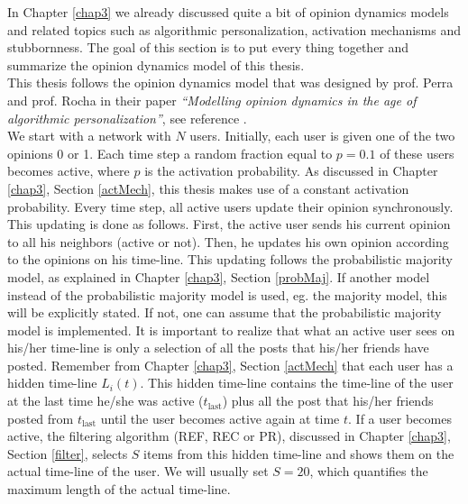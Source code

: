 \documentclass[11 pt , letterpaper , twoside , openright]{book}
\begin{document}
In Chapter \ref{chap3} we already discussed quite a bit of opinion dynamics models and related topics such as algorithmic personalization, activation mechanisms and stubbornness. The goal of this section is to put every thing together and summarize the opinion dynamics model of this thesis.\\
\newline
This thesis follows the opinion dynamics model that was designed by prof. Perra and prof. Rocha in their paper \textit{``Modelling opinion dynamics in the age of algorithmic personalization''}, see reference \cite{Perra2019}. \\
We start with a network with $N$ users. Initially, each user is given one of the two opinions 0 or 1. Each time step a random fraction equal to $p= 0.1$ of these users becomes active, where $p$ is the activation probability. As discussed in Chapter \ref{chap3}, Section \ref{actMech}, this thesis makes use of a constant activation probability. Every time step, all active users update their opinion synchronously. This updating is done as follows. First, the active user sends his current opinion to all his neighbors (active or not). Then, he updates his own opinion according to the opinions on his time-line. This updating follows the probabilistic majority model, as explained in Chapter \ref{chap3}, Section \ref{probMaj}. If another model instead of the probabilistic majority model is used, eg. the majority model, this will be explicitly stated. If not, one can assume that the probabilistic majority model is implemented. It is important to realize that what an active user sees on his/her time-line is only a selection of all the posts that his/her friends have posted. Remember from Chapter \ref{chap3}, Section \ref{actMech} that each user has a hidden time-line $L_i(t)$. This hidden time-line contains the time-line of the user at the last time he/she was active ($t_{\text{last}}$) plus all the post that his/her friends posted from $t_{\text{last}}$ until the user becomes active again at time $t$. If a user becomes active, the filtering algorithm (REF, REC or PR), discussed in Chapter \ref{chap3}, Section \ref{filter}, selects $S$ items from this hidden time-line and shows them on the actual time-line of the user. We will usually set $S = 20$, which quantifies the maximum length of the actual time-line.\\
\end{document}
